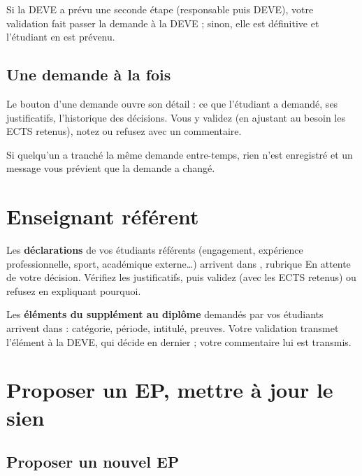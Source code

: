\documentclass[11pt,a4paper]{article}
\begin{document}
\begin{astuce}
Si la DEVE a prévu une seconde étape (\og responsable puis DEVE\fg{}), votre validation fait
passer la demande à la DEVE ; sinon, elle est définitive et l'étudiant en est prévenu.
\end{astuce}

\subsection{Une demande à la fois}

Le bouton  d'une demande ouvre son détail : ce que l'étudiant a demandé, ses
justificatifs, l'historique des décisions. Vous y validez (en ajustant au besoin les ECTS
retenus), notez ou refusez avec un commentaire.


Si quelqu'un a tranché la même demande entre-temps, rien n'est enregistré et un message vous
prévient que la demande a changé.

\section{Enseignant référent}

Les \textbf{déclarations} de vos étudiants référents (engagement, expérience
professionnelle, sport, académique externe\dots) arrivent dans , rubrique
\og En attente de votre décision\fg{}. Vérifiez les justificatifs, puis validez (avec les ECTS
retenus) ou refusez en expliquant pourquoi.

Les \textbf{éléments du supplément au diplôme} demandés par vos étudiants arrivent dans
 : catégorie, période, intitulé, preuves. Votre
validation transmet l'élément à la DEVE, qui décide en dernier ; votre commentaire lui est
transmis.


\section{Proposer un EP, mettre à jour le sien}

\subsection{Proposer un nouvel EP}
\end{document}
